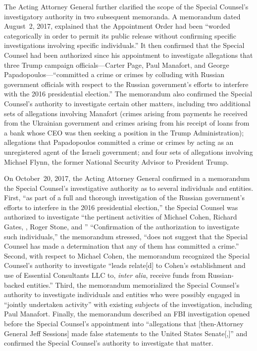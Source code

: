 The Acting Attorney General further clarified the scope of the Special Counsel's investigatory authority in two subsequent memoranda.
A memorandum dated August~2, 2017, explained that the Appointment Order had been ``worded categorically in order to permit its public release without confirming specific investigations involving specific individuals.''
It then confirmed that the Special Counsel had been authorized since his appointment to investigate allegations that three Trump campaign officials---Carter Page, Paul Manafort, and George Papadopoulos---``committed a crime or crimes by colluding with Russian government officials with respect to the Russian government's efforts to interfere with the 2016 presidential election.''
The memorandum also confirmed the Special Counsel's authority to investigate certain other matters, including two additional sets of allegations involving Manafort (crimes arising from payments he received from the Ukrainian government and crimes arising from his receipt of loans from a bank whose CEO was then seeking a position in the Trump Administration); allegations that Papadopoulos committed a crime or crimes by acting as an unregistered agent of the Israeli government; and four sets of allegations involving Michael Flynn, the former National Security Advisor to President Trump.

On October~20, 2017, the Acting Attorney General confirmed in a memorandum the Special Counsel's investigative authority as to several individuals and entities.
First, ``as part of a full and thorough investigation of the Russian government's efforts to interfere in the 2016 presidential election,'' the Special Counsel was authorized to investigate ``the pertinent activities of Michael Cohen, Richard Gates, , Roger Stone, and '' ``Confirmation of the authorization to investigate such individuals,'' the memorandum stressed, ``does not suggest that the Special Counsel has made a determination that any of them has committed a crime.''
Second, with respect to Michael Cohen, the memorandum recognized the Special Counsel's authority to investigate ``leads relate[d] to Cohen's establishment and use of Essential Consultants LLC to, \textit{inter alia}, receive funds from Russian-backed entities.''
Third, the memorandum memorialized the Special Counsel's authority to investigate individuals and entities who were possibly engaged in ``jointly undertaken activity'' with existing subjects of the investigation, including Paul Manafort.
Finally, the memorandum described an FBI investigation opened before the Special Counsel's appointment into ``allegations that [then-Attorney General Jeff Sessions] made false statements to the United States Senate[,]'' and confirmed the Special Counsel's authority to investigate that matter.

